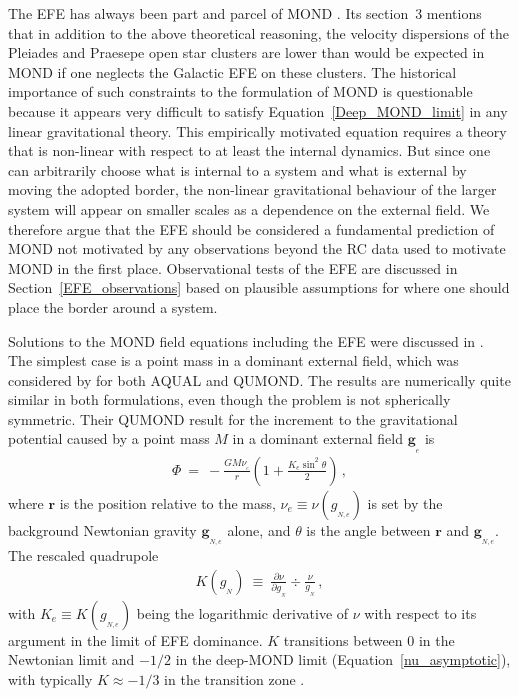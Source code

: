 \documentclass[fleqn,usenatbib,useAMS]{mnras} %
\begin{document}
The EFE has always been part and parcel of MOND \citep{Milgrom_1983}. Its section~3 mentions that in addition to the above theoretical reasoning, the velocity dispersions of the Pleiades \citep{Jones_1970} and Praesepe \citep{Jones_1971} open star clusters are lower than would be expected in MOND if one neglects the Galactic EFE on these clusters. The historical importance of such constraints to the formulation of MOND is questionable because it appears very difficult to satisfy Equation~\ref{Deep_MOND_limit} in any linear gravitational theory. This empirically motivated equation requires a theory that is non-linear with respect to at least the internal dynamics. But since one can arbitrarily choose what is internal to a system and what is external by moving the adopted border, the non-linear gravitational behaviour of the larger system will appear on smaller scales as a dependence on the external field. We therefore argue that the EFE should be considered a fundamental prediction of MOND not motivated by any observations beyond the RC data used to motivate MOND in the first place. Observational tests of the EFE are discussed in Section~\ref{EFE_observations} based on plausible assumptions for where one should place the border around a system.

Solutions to the MOND field equations including the EFE were discussed in \citet{Milgrom_1986}. The simplest case is a point mass in a dominant external field, which was considered by \citet{Banik_2018_EFE} for both AQUAL and QUMOND. The results are numerically quite similar in both formulations, even though the problem is not spherically symmetric. Their QUMOND result for the increment to the gravitational potential caused by a point mass $M$ in a dominant external field $\bm{g}_{_e}$ is
\begin{eqnarray}
	\Phi ~=~ -\frac{GM\nu_{_e}}{r} \left( 1 + \frac{K_e \sin^2 \theta}{2} \right) \, ,
	\label{Point_mass_EFE_QUMOND}
\end{eqnarray}
where $\bm{r}$ is the position relative to the mass, $\nu_e \equiv \nu \left( g_{_{N,e}} \right)$ is set by the background Newtonian gravity $\bm{g}_{_{N,e}}$ alone, and $\theta$ is the angle between $\bm{r}$ and $\bm{g}_{_{N,e}}$. The rescaled quadrupole
\begin{eqnarray}
	K \left( g_{_N} \right) ~\equiv~ \frac{\partial \nu}{\partial g_{_N}} \div \frac{\nu}{g_{_N}} \, ,
	\label{K_def}
\end{eqnarray}
with $K_e \equiv K \left( g_{_{N,e}} \right)$ being the logarithmic derivative of $\nu$ with respect to its argument in the limit of EFE dominance. $K$ transitions between 0 in the Newtonian limit and $-1/2$ in the deep-MOND limit (Equation~\ref{nu_asymptotic}), with typically $K \approx -1/3$ in the transition zone \citep[$K \approx -0.26$ in the Solar neighbourhood where $g_{_{N,e}} = 1.2 \, a_{_0}$; see section~3.6 of][]{Banik_2018_Centauri}.
\end{document}
